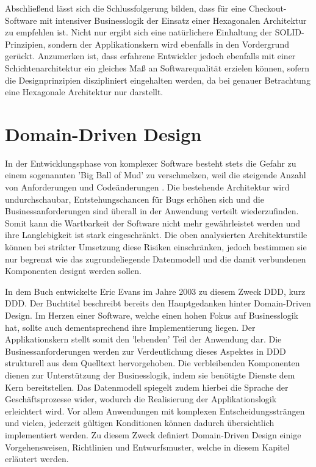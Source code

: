 Abschließend lässt sich die Schlussfolgerung bilden, dass für eine Checkout-Software mit intensiver Businesslogik der Einsatz einer Hexagonalen Architektur zu empfehlen ist. Nicht nur ergibt sich eine natürlichere Einhaltung der SOLID-Prinzipien, sondern der Applikationskern wird ebenfalls in den Vordergrund gerückt. Anzumerken ist, dass erfahrene Entwickler jedoch ebenfalls mit einer Schichtenarchitektur ein gleiches Maß an Softwarequalität erzielen können, sofern die Designprinzipien diszipliniert eingehalten werden, da bei genauer Betrachtung eine Hexagonale Architektur nur  darstellt. 

\section{Domain-Driven Design}

In der Entwicklungsphase von komplexer Software besteht stets die Gefahr zu einem sogenannten 'Big Ball of Mud' zu verschmelzen, weil die steigende Anzahl von Anforderungen und Codeänderungen . Die bestehende Architektur wird undurchschaubar, Entstehungschancen für Bugs erhöhen sich und die Businessanforderungen sind überall in der Anwendung verteilt wiederzufinden. Somit kann die Wartbarkeit der Software nicht mehr gewährleistet werden und ihre Langlebigkeit ist stark eingeschränkt. Die oben analysierten Architekturstile können bei strikter Umsetzung diese Risiken einschränken, jedoch bestimmen sie nur begrenzt wie das zugrundeliegende Datenmodell und die damit verbundenen Komponenten designt werden sollen. 

In dem Buch  entwickelte Eric Evans im Jahre 2003 zu diesem Zweck \acrlong{DDD}, kurz \acrshort{DDD}. Der Buchtitel beschreibt bereits den Hauptgedanken hinter Domain-Driven Design. Im Herzen einer Software, welche einen hohen Fokus auf Businesslogik hat, sollte auch dementsprechend ihre Implementierung liegen. Der Applikationskern stellt somit den 'lebenden' Teil der Anwendung dar. Die Businessanforderungen werden zur Verdeutlichung dieses Aspektes in DDD strukturell aus dem Quelltext hervorgehoben. Die verbleibenden Komponenten dienen zur Unterstützung der Businesslogik, indem sie benötigte Dienste dem Kern bereitstellen. Das Datenmodell spiegelt zudem hierbei die Sprache der Geschäftsprozesse wider, wodurch die Realisierung der Applikationslogik erleichtert wird. Vor allem Anwendungen mit komplexen Entscheidungssträngen und vielen, jederzeit gültigen Konditionen können dadurch übersichtlich implementiert werden. Zu diesem Zweck definiert Domain-Driven Design einige Vorgehensweisen, Richtlinien und Entwurfsmuster, welche in diesem Kapitel erläutert werden. 

